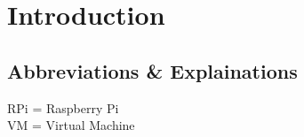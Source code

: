 \documentclass[12pt,a4paper,titlepage]{article}
\begin{document}

\newpage

\tableofcontents
\newpage


\section{Introduction}

\subsection{Abbreviations \& Explainations} %
RPi = Raspberry Pi\\
VM = Virtual Machine\\



















\newpage



\end{document}

